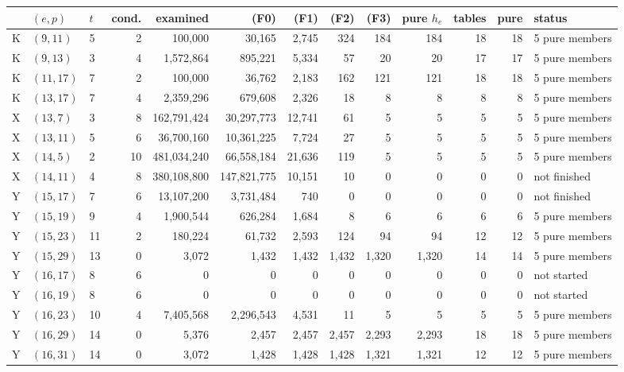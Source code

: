 \begin{tabular}{@{}lllrrrrrrrrrl@{}}
\toprule
 & $(e,p)$ & $t$ & cond. & examined & (F0) & (F1) & (F2) & (F3) & pure $h_e$ & tables & pure & status\\
\midrule
K & $(9,11)$ & 5 & 2 & 100{,}000 & 30{,}165 & 2{,}745 & 324 & 184 & 184 & 18 & 18 & 5 pure members\\
K & $(9,13)$ & 3 & 4 & 1{,}572{,}864 & 895{,}221 & 5{,}334 & 57 & 20 & 20 & 17 & 17 & 5 pure members\\
K & $(11,17)$ & 7 & 2 & 100{,}000 & 36{,}762 & 2{,}183 & 162 & 121 & 121 & 18 & 18 & 5 pure members\\
K & $(13,17)$ & 7 & 4 & 2{,}359{,}296 & 679{,}608 & 2{,}326 & 18 & 8 & 8 & 8 & 8 & 5 pure members\\
X & $(13,7)$ & 3 & 8 & 162{,}791{,}424 & 30{,}297{,}773 & 12{,}741 & 61 & 5 & 5 & 5 & 5 & 5 pure members\\
X & $(13,11)$ & 5 & 6 & 36{,}700{,}160 & 10{,}361{,}225 & 7{,}724 & 27 & 5 & 5 & 5 & 5 & 5 pure members\\
X & $(14,5)$ & 2 & 10 & 481{,}034{,}240 & 66{,}558{,}184 & 21{,}636 & 119 & 5 & 5 & 5 & 5 & 5 pure members\\
X & $(14,11)$ & 4 & 8 & 380{,}108{,}800 & 147{,}821{,}775 & 10{,}151 & 10 & 0 & 0 & 0 & 0 & not finished\\
Y & $(15,17)$ & 7 & 6 & 13{,}107{,}200 & 3{,}731{,}484 & 740 & 0 & 0 & 0 & 0 & 0 & not finished\\
Y & $(15,19)$ & 9 & 4 & 1{,}900{,}544 & 626{,}284 & 1{,}684 & 8 & 6 & 6 & 6 & 6 & 5 pure members\\
Y & $(15,23)$ & 11 & 2 & 180{,}224 & 61{,}732 & 2{,}593 & 124 & 94 & 94 & 12 & 12 & 5 pure members\\
Y & $(15,29)$ & 13 & 0 & 3{,}072 & 1{,}432 & 1{,}432 & 1{,}432 & 1{,}320 & 1{,}320 & 14 & 14 & 5 pure members\\
Y & $(16,17)$ & 8 & 6 & 0 & 0 & 0 & 0 & 0 & 0 & 0 & 0 & not started\\
Y & $(16,19)$ & 8 & 6 & 0 & 0 & 0 & 0 & 0 & 0 & 0 & 0 & not started\\
Y & $(16,23)$ & 10 & 4 & 7{,}405{,}568 & 2{,}296{,}543 & 4{,}531 & 11 & 5 & 5 & 5 & 5 & 5 pure members\\
Y & $(16,29)$ & 14 & 0 & 5{,}376 & 2{,}457 & 2{,}457 & 2{,}457 & 2{,}293 & 2{,}293 & 18 & 18 & 5 pure members\\
Y & $(16,31)$ & 14 & 0 & 3{,}072 & 1{,}428 & 1{,}428 & 1{,}428 & 1{,}321 & 1{,}321 & 12 & 12 & 5 pure members\\
\bottomrule
\end{tabular}
